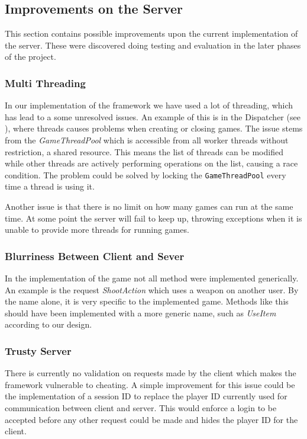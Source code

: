\subsection{Improvements on the Server}
This section contains possible improvements upon the current implementation of the server. These were discovered doing testing and evaluation in the later phases of the project.  

\subsubsection{Multi Threading}
In our implementation of the framework we have used a lot of threading, which has lead to a some unresolved issues. An example of this is in the Dispatcher (see ), where threads causes problems when creating or closing games. The issue stems from the \textit{GameThreadPool} which is accessible from all worker threads without restriction, a shared resource. This means the list of threads can be modified while other threads are actively performing operations on the list, causing a race condition. The problem could be solved by locking the \texttt{GameThreadPool} every time a thread is using it.

Another issue is that there is no limit on how many games can run at the same time. At some point the server will fail to keep up, throwing exceptions when it is unable to provide more threads for running games.

\subsubsection{Blurriness Between Client and Sever}
In the implementation of the game not all method were implemented generically. An example is the request \textit{ShootAction} which uses a weapon on another user. By the name alone, it is very specific to the implemented game. Methods like this should have been implemented with a more generic name, such as \textit{UseItem} according to our design.

\subsubsection{Trusty Server}
There is currently no validation on requests made by the client which makes the framework vulnerable to cheating. A simple improvement for this issue could be the implementation of a session ID to replace the player ID currently used for communication between client and server. This would enforce a login to be accepted before any other request could be made and hides the player ID for the client.